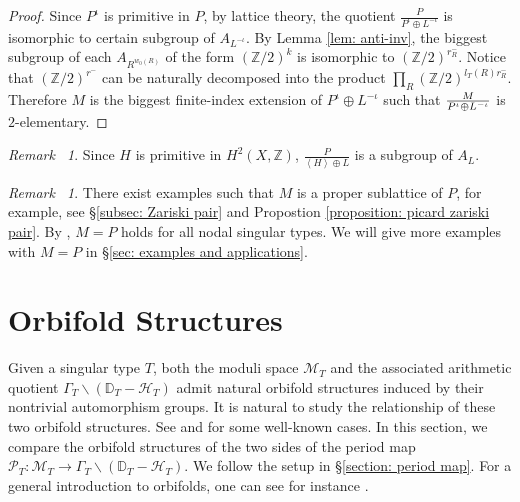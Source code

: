 \documentclass[12pt,reqno,a4paper]{amsart}
\theoremstyle{remark}
\newtheorem{rmk}[thm]{Remark~}
\theoremstyle{definition}
\begin{document}
\begin{proof}
    Since $P^{\iota}$ is primitive in $P$, by lattice theory, the quotient $\frac{P}{P^{\iota}\oplus L^{-\iota}}$ is isomorphic to certain subgroup of $A_{L^{-\iota}}$. 
        By Lemma \ref{lem: anti-inv}, the biggest subgroup of each $A_{R^{w_0(R)}}$ of the form $(\mathbb{Z}/2)^k$ is isomorphic to $(\mathbb{Z}/2)^{r_R^-}$.
    Notice that $(\mathbb{Z}/2)^{r^-}$ can be naturally decomposed into the product $\prod\limits_{R}(\mathbb{Z}/2)^{l_T(R)r_R^-}$.
    Therefore $M$ is the biggest finite-index extension of $P^{\iota}\oplus L^{-\iota}$ such that $M\over{P^{\iota}\oplus L^{-\iota}}$ is $2$-elementary.
    \end{proof}

\begin{rmk}
   Since $H$ is primitive in $H^2(X,\mathbb{Z})$, $\frac{P}{\left\langle H \right\rangle \oplus L}$ is a subgroup of $A_L$. 
\end{rmk}

\begin{rmk}
    There exist examples such that $M$ is a proper sublattice of $P$, for example, see \S \ref{subsec: Zariski pair} and Propostion \ref{proposition: picard zariski pair}.
    By \cite[Proposition 3.4]{yu2023moduli}, $M=P$ holds for all nodal singular types.
    We will give more examples with $M=P$ in \S \ref{sec: examples and applications}.
\end{rmk}















\section{Orbifold Structures}
\label{sec: orbifold structures}
Given a singular type $T$, both the moduli space $\mathcal{M}_T$ and the associated arithmetic quotient $\Gamma_T\backslash(\mathbb{D}_T-\mathcal{H}_T)$ admit natural orbifold structures induced by their nontrivial automorphism groups. It is natural to study the relationship of these two orbifold structures. See \cite{kudla2012occult} and \cite{zheng2021orbifold} for some well-known cases. In this section, we compare the orbifold structures of the two sides of the period map $\mathscr{P}_T\colon \mathcal{M}_T\to \Gamma_T\backslash(\mathbb{D}_T-\mathcal{H}_T)$.
We follow the setup in \S \ref{section: period map}.
For a general introduction to orbifolds, one can see for instance \cite[Chapter 13]{thurston2022geometry}.
\end{document}
